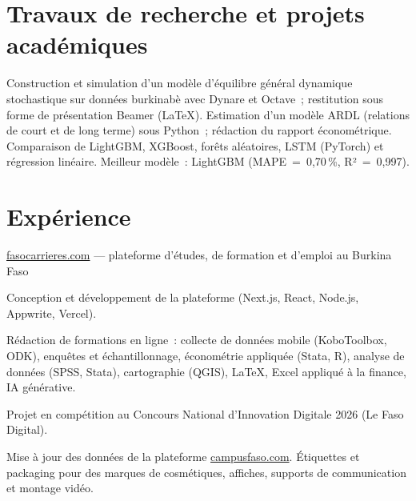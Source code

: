 \documentclass[10pt]{article}
\begin{document}
\section{Travaux de recherche et projets académiques}
  {Construction et simulation d'un modèle d'équilibre général dynamique stochastique sur données burkinabè avec
   Dynare et Octave~; restitution sous forme de présentation Beamer (\LaTeX).}
  {Estimation d'un modèle ARDL (relations de court et de long terme) sous Python~; rédaction du rapport économétrique.}
  {Comparaison de LightGBM, XGBoost, forêts aléatoires, LSTM (PyTorch) et régression linéaire.
   Meilleur modèle~: LightGBM (MAPE~=~0,70\,\%, R²~=~0,997).}

\section{Expérience}
  {\href{https://fasocarrieres.com}{fasocarrieres.com} — plateforme d'études, de formation et d'emploi au Burkina Faso}
  {\begin{cvlist}
     \item Conception et développement de la plateforme (Next.js, React, Node.js, Appwrite, Vercel).
     \item Rédaction de formations en ligne~: collecte de données mobile (KoboToolbox, ODK), enquêtes et échantillonnage,
           économétrie appliquée (Stata, R), analyse de données (SPSS, Stata), cartographie (QGIS), \LaTeX{},
           Excel appliqué à la finance, IA générative.
     \item Projet en compétition au Concours National d'Innovation Digitale 2026 (Le Faso Digital).
   \end{cvlist}}
  {Mise à jour des données de la plateforme \href{https://campusfaso.com}{campusfaso.com}.}
  {Étiquettes et packaging pour des marques de cosmétiques, affiches, supports de communication et montage vidéo.}
\end{document}
